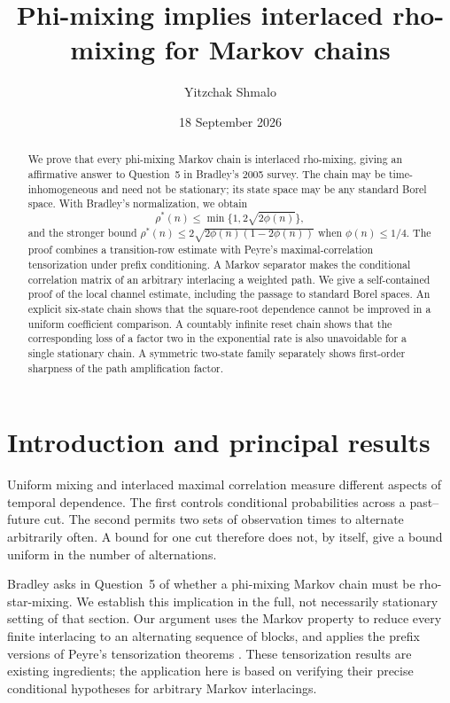 \documentclass[11pt]{amsart}
\title[Phi-mixing and interlaced maximal correlation]{Phi-mixing implies interlaced rho-mixing for Markov chains}
\author{Yitzchak Shmalo}
\date{18 September 2026}
\numberwithin{equation}{section}
\theoremstyle{definition}
\begin{document}
\begin{abstract}
We prove that every phi-mixing Markov chain is interlaced rho-mixing, giving an affirmative answer to Question~5 in Bradley's 2005 survey. The chain may be time-inhomogeneous and need not be stationary; its state space may be any standard Borel space. With Bradley's normalization, we obtain
\[
\rho^*(n)\le \min\{1,2\sqrt{2\phi(n)}\},
\]
and the stronger bound $\rho^*(n)\le 2\sqrt{2\phi(n)(1-2\phi(n))}$ when $\phi(n)\le1/4$. The proof combines a transition-row estimate with Peyre's maximal-correlation tensorization under prefix conditioning. A Markov separator makes the conditional correlation matrix of an arbitrary interlacing a weighted path. We give a self-contained proof of the local channel estimate, including the passage to standard Borel spaces. An explicit six-state chain shows that the square-root dependence cannot be improved in a uniform coefficient comparison. A countably infinite reset chain shows that the corresponding loss of a factor two in the exponential rate is also unavoidable for a single stationary chain. A symmetric two-state family separately shows first-order sharpness of the path amplification factor.
\end{abstract}
\maketitle

\section{Introduction and principal results}

Uniform mixing and interlaced maximal correlation measure different aspects of temporal dependence. The first controls conditional probabilities across a past--future cut. The second permits two sets of observation times to alternate arbitrarily often. A bound for one cut therefore does not, by itself, give a bound uniform in the number of alternations.

Bradley asks in Question~5 of \cite[Section~3, p.~119]{Bradley2005} whether a phi-mixing Markov chain must be rho-star-mixing. We establish this implication in the full, not necessarily stationary setting of that section. Our argument uses the Markov property to reduce every finite interlacing to an alternating sequence of blocks, and applies the prefix versions of Peyre's tensorization theorems \cite[Theorems~3.3.1 and~3.3.10; Section~3.4(a)]{Peyre2010}. These tensorization results are existing ingredients; the application here is based on verifying their precise conditional hypotheses for arbitrary Markov interlacings.
\end{document}
